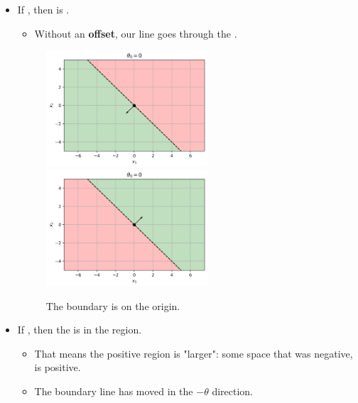         \begin{itemize}
            \item If , then  is .
                \begin{itemize}
                    \item Without an \textbf{offset}, our line goes through the .
                \end{itemize}
                
                \begin{figure}[H]
                    \centering                         \includegraphics[width=60mm,scale=0.5]{images/classification_images/theta_0_zero.png}
                    \includegraphics[width=60mm,scale=0.5]{images/classification_images/zero_theta0_positive_theta.png}
                        \caption*{The boundary is on the origin.}
                \end{figure}
                
            \item If , then the  is in the  region.
                \begin{itemize}
                    \item That means the positive region is "larger": some space that was negative, is positive.
                    \item The boundary line has moved in the $-\theta$ direction.
                \end{itemize}
                

\end{itemize}
